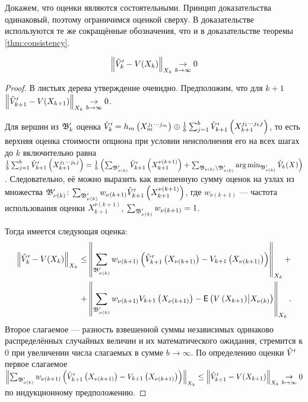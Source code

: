 Докажем, что оценки являются состоятельными. Принцип доказательства одинаковый, поэтому ограничимся оценкой сверху. В доказательстве используются те же сокращённые обозначения, что и в доказательстве теоремы \ref{thm:consistency}.
\begin{theorem}
	$$\left\lVert\hat{V}'_k - V(X_k)\right\rVert_{X_k}\underset{b\to\infty}{\to} 0$$
\end{theorem}
\begin{proof}
    В листьях дерева утверждение очевидно. Предположим, что для $k+1$ $\left\lVert\hat{V}'_{k+1} - V(X_{k+1})\right\rVert_{X_k}\underset{b\to\infty}{\to} 0$.

    Для вершин из $\mathfrak{B}'_k$ оценка $\hat{V}'_k = h_m\left(X_m^{j_1\cdots j_m}\right)\oplus\frac{1}{b}\sum_{j=1}^b \hat{V}'_{k+1}\left(X_{k+1}^{j_1\cdots j_k j}\right)$, то есть верхняя оценка стоимости опциона при условии неисполнения его на всех шагах до $k$ включительно равна $\frac{1}{b}\sum_{j=1}^b \hat{V}'_{k+1}\left(X_{k+1}^{j_1\cdots j_k j}\right) = \frac{1}{b}\left(\sum_{\mathfrak{B}'_{\nu(k)}} \hat{V}'_{k+1}\left(X_{k+1}^{\nu(k+1)}\right) + \sum_{\mathfrak{B}_{\nu(k)}\setminus\mathfrak{B}'_{\nu(k)}}\operatorname*{arg\,min}_{\mathfrak{B}'_{\nu(k)}} \hat{V}_k(X)\right)$. Следовательно, её можно выразить как взвешенную сумму оценок на узлах из множества $\mathfrak{B}'_{\nu(k)}$: $\sum_{\mathfrak{B}'_{\nu(k)}} w_{\nu(k+1)}\hat{V}'_{k+1}\left(X_{k+1}^{\nu(k+1)}\right)$, где $w_{\nu(k+1)}$ --- частота использования оценки $X_{k+1}^{\nu(k+1)}$, $\sum_{\mathfrak{B}'_{\nu(k)}} w_{\nu(k+1)} = 1$. 

    Тогда имеется следующая оценка: $$
    \begin{aligned}
    	\left\lVert\hat{V}'_k - V(X_k)\right\rVert_{X_k} \leq 
    	&\left\lVert\sum_{\mathfrak{B}'_{\nu(k)}} w_{\nu(k+1)}\left(\hat{V}'_{k+1}\left(X_{\nu(k+1)}\right) - V_{k+1}\left(X_{\nu(k+1)}\right)\right)\right\rVert_{X_k} + \\
    	+&\left\lVert\sum_{\mathfrak{B}'_{\nu(k)}} w_{\nu(k+1)}V_{k+1}\left(X_{\nu(k+1)}\right) - \mathsf{E}\left(V\left(X_{k+1}\right)\middle\vert X_{\nu(k)}\right)\right\rVert_{X_k}.
    \end{aligned}
    $$ 
    Второе слагаемое --- разность взвешенной суммы независимых одинаково распределённых случайных величин и их математического ожидания, стремится к 0 при увеличении числа слагаемых в сумме $b\to\infty$. По определению оценки $\hat{V}'$ первое слагаемое $\left\lVert\sum_{\mathfrak{B}'_{\nu(k)}} w_{\nu(k+1)}\left(\hat{V}'_{k+1}\left(X_{\nu(k+1)}\right) - V_{k+1}\left(X_{\nu(k+1)}\right)\right)\right\rVert_{X_k} \leq \left\lVert\hat{V}'_{k+1} - V(X_{k+1})\right\rVert_{X_k}\underset{b\to\infty}{\to} 0$ по индукционному предположению.
\end{proof}

